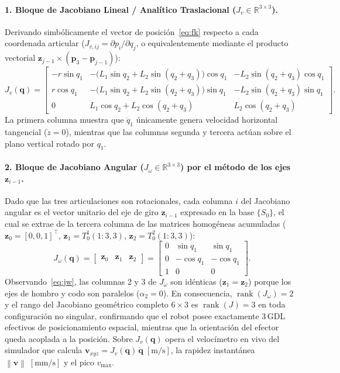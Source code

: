 \documentclass[11pt,a4paper]{article}
\newcommand{\Real}{\mathbb{R}}
\newcommand{\T}{^{\!\top}}
\newcommand{\norm}[1]{\left\lVert#1\right\rVert}
\newcommand{\qdot}{\dot{\bm{q}}}
\begin{document}
\paragraph{1. Bloque de Jacobiano Lineal / Analítico Traslacional ($J_{v}\in\Real^{3\times 3}$).}
Derivando simbólicamente el vector de posición~\eqref{eq:fk} respecto a cada coordenada articular ($J_{v,ij}=\partial p_{i}/\partial q_{j}$, o equivalentemente mediante el producto vectorial $\bm{z}_{j-1}\times(\bm{p}_{3}-\bm{p}_{j-1})$):
\begin{equation}\label{eq:jac}
J_{v}(\bm{q})=
\begin{bmatrix}
-r\sin q_{1} & -\bigl(L_{1}\sin q_{2}+L_{2}\sin(q_{2}+q_{3})\bigr)\cos q_{1} & -L_{2}\sin(q_{2}+q_{3})\cos q_{1}\\[3pt]
 r\cos q_{1} & -\bigl(L_{1}\sin q_{2}+L_{2}\sin(q_{2}+q_{3})\bigr)\sin q_{1} & -L_{2}\sin(q_{2}+q_{3})\sin q_{1}\\[3pt]
 0           &  L_{1}\cos q_{2}+L_{2}\cos(q_{2}+q_{3})                      &  L_{2}\cos(q_{2}+q_{3})
\end{bmatrix}.
\end{equation}
La primera columna muestra que $\dot{q}_{1}$ únicamente genera velocidad horizontal tangencial ($\dot{z}=0$), mientras que las columnas segunda y tercera actúan sobre el plano vertical rotado por $q_{1}$.

\paragraph{2. Bloque de Jacobiano Angular ($J_{\omega}\in\Real^{3\times 3}$) por el método de los ejes $\bm{z}_{i-1}$.}
Dado que las tres articulaciones son rotacionales, cada columna $i$ del Jacobiano angular es el vector unitario del eje de giro $\bm{z}_{i-1}$ expresado en la base $\{S_{0}\}$, el cual se extrae de la tercera columna de las matrices homogéneas acumuladas ($\bm{z}_{0}=[0,0,1]\T$, $\bm{z}_{1}=T_{0}^{1}(1:3,3)$, $\bm{z}_{2}=T_{0}^{2}(1:3,3)$):
\begin{equation}\label{eq:jw}
J_{\omega}(\bm{q})=\begin{bmatrix}\bm{z}_{0} & \bm{z}_{1} & \bm{z}_{2}\end{bmatrix}=
\begin{bmatrix}
0 &  \sin q_{1} &  \sin q_{1}\\
0 & -\cos q_{1} & -\cos q_{1}\\
1 &  0          &  0
\end{bmatrix}.
\end{equation}
Observando~\eqref{eq:jw}, las columnas 2 y 3 de $J_{\omega}$ son idénticas ($\bm{z}_{1}=\bm{z}_{2}$) porque los ejes de hombro y codo son paralelos ($\alpha_{2}=0$). En consecuencia, $\operatorname{rank}(J_{\omega})=2$ y el rango del Jacobiano geométrico completo $6\times 3$ es $\operatorname{rank}(J)=3$ en toda configuración no singular, confirmando que el robot posee exactamente 3\,GDL efectivos de posicionamiento espacial, mientras que la orientación del efector queda acoplada a la posición. Sobre $J_{v}(\bm{q})$ opera el velocímetro en vivo del simulador que calcula $\bm{v}_{xyz}=J_{v}(\bm{q})\,\qdot\;[\text{m/s}]$, la rapidez instantánea $\norm{\bm{v}}\;[\text{mm/s}]$ y el pico $v_{\max}$.
\end{document}
